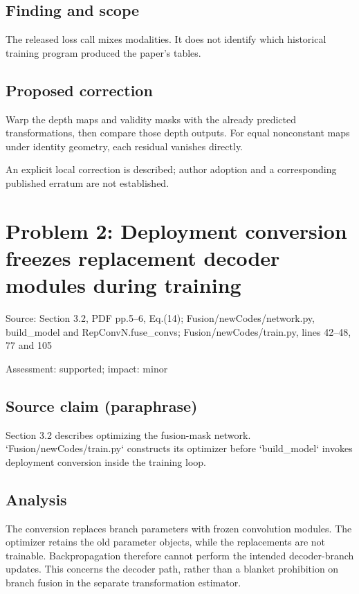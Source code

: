 \documentclass[11pt]{article}
\begin{document}
\subsection*{Finding and scope}

The released loss call mixes modalities. It does not identify which historical training program produced the paper’s tables.

\subsection*{Proposed correction}

Warp the depth maps and validity masks with the already predicted transformations, then compare those depth outputs. For equal nonconstant maps under identity geometry, each residual vanishes directly.

An explicit local correction is described; author adoption and a corresponding published erratum are not established.

\section*{Problem 2: Deployment conversion freezes replacement decoder modules during training}

Source: Section 3.2, PDF pp.5–6, Eq.(14); Fusion/newCodes/network.py, build\_model and RepConvN.fuse\_convs; Fusion/newCodes/train.py, lines 42–48, 77 and 105

Assessment: supported; impact: minor

\subsection*{Source claim (paraphrase)}

Section 3.2 describes optimizing the fusion-mask network. `Fusion/newCodes/train.py` constructs its optimizer before `build\_model` invokes deployment conversion inside the training loop.

\subsection*{Analysis}

The conversion replaces branch parameters with frozen convolution modules. The optimizer retains the old parameter objects, while the replacements are not trainable. Backpropagation therefore cannot perform the intended decoder-branch updates. This concerns the decoder path, rather than a blanket prohibition on branch fusion in the separate transformation estimator.
\end{document}
